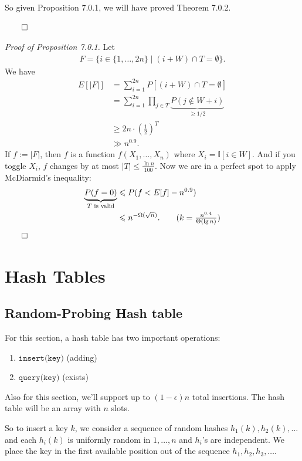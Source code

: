 \documentclass{report}
\begin{document}
So given Proposition 7.0.1, we will have proved Theorem 7.0.2.

\hfill $\qed$

\noindent \textit{Proof of Proposition 7.0.1.} Let 
\begin{align*}
    F = \{ i \in \{1, \ldots, 2n \} \mid (i + W) \cap T  = \emptyset \}.
\end{align*}
We have 
\begin{align*}
    E[|F|] &= \sum_{i=1}^{2n} P[(i + W) \cap T = \emptyset] \\
    &= \sum_{i=1}^{2n} \prod_{j \in T} \underbrace{P(j \notin W + i)}_{\geq 1/2} \\
    &\geq 2n \cdot \left( \frac 12 \right)^{T} \\
    &\gg n^{0.9}.
\end{align*}
If $f := |F|$, then $f$ is a function $f(X_1, \ldots, X_n)$ where $X_i = \mathbb I[i  \in W]$. And if you toggle $X_i$, $f$ changes by at most $|T| \leq \frac{\ln n}{100}$. Now we are in a perfect spot to apply McDiarmid's inequality:
\begin{align*}
    \underbrace{P(f = 0)}_{T \text{ is valid}} &\leq P(f < E[f] - n^{0.9}) \\
    &\leq n^{-\Omega(\sqrt n)}. \tag{$k = \frac{n^{0.4}}{\Theta (\lg n)}$}
\end{align*}
\hfill $\qed$
\newpage

\chapter{Hash Tables}
\section{Random-Probing Hash table}
For this section, a hash table has two important operations:
\begin{enumerate}
    \item $\texttt{insert(key)}$ (adding)
    \item $\texttt{query(key)}$ (exists)
\end{enumerate} 
Also for this section, we'll support up to $(1-\epsilon)n$ total insertions. The hash table will be an array with $n$ slots. 

\begin{center}
\end{center}
So to insert a key $k$, we consider a sequence of random hashes $h_1(k), h_2(k), \ldots$ and each $h_i(k)$ is uniformly random in $1, \ldots, n$ and $h_i$'s are independent. We place the key in the first available position out of the sequence $h_1, h_2, h_3, \ldots$. 
\end{document}

